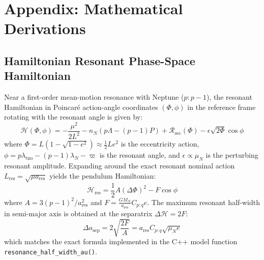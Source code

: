 \documentclass[11pt,a4paper]{article}
\begin{document}
\appendix
\section{Appendix: Mathematical Derivations}

\subsection{Hamiltonian Resonant Phase-Space Hamiltonian}
Near a first-order mean-motion resonance with Neptune ($p:p-1$), the resonant Hamiltonian in Poincaré action-angle coordinates $(\Phi, \phi)$ in the reference frame rotating with the resonant angle is given by:
\begin{equation}
\mathcal{H}(\Phi, \phi) = -\frac{\mu^2}{2 L^2} - n_N (p \Lambda - (p-1) P) + \mathcal{R}_{\text{sec}}(\Phi) - \epsilon \sqrt{2\Phi} \cos\phi
\end{equation}
where $\Phi = L(1 - \sqrt{1-e^2}) \approx \frac{1}{2} L e^2$ is the eccentricity action, $\phi = p\lambda_{\text{tno}} - (p-1)\lambda_N - \varpi$ is the resonant angle, and $\epsilon \propto \mu_N$ is the perturbing resonant amplitude. Expanding around the exact resonant nominal action $L_{\text{res}} = \sqrt{\mu a_{\text{res}}}$ yields the pendulum Hamiltonian:
\begin{equation}
\mathcal{H}_{\text{res}} = \frac{1}{2} A (\Delta \Phi)^2 - F \cos\phi
\end{equation}
where $A = 3 (p-1)^2 / a_{\text{res}}^2$ and $F = \frac{G M_N}{a_{\text{res}}} C_{p:q} e$. The maximum resonant half-width in semi-major axis is obtained at the separatrix $\Delta \mathcal{H} = 2F$:
\begin{equation}
\Delta a_{\text{sep}} = 2 \sqrt{\frac{2F}{A}} = a_{\text{res}} C_{p:q} \sqrt{\mu_N e}
\end{equation}
which matches the exact formula implemented in the C++ model function \texttt{resonance\_half\_width\_au()}.
\end{document}
